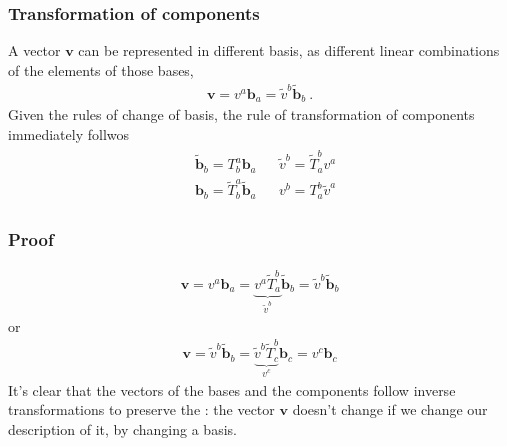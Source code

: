 \documentclass[letterpaper,10pt,english]{jupyterBook}
\begin{document}
\subsubsection{Transformation of components}
\label{\detokenize{ch/tensor-algebra-calculus/algebra:transformation-of-components}}
\sphinxAtStartPar
A vector \(\mathbf{v}\) can be represented in different basis, as different linear combinations of the elements of those bases,
\begin{equation*}
\begin{split}\mathbf{v} = v^{a} \mathbf{b}_a = \widetilde{v}^b \widetilde{\mathbf{b}}_b \ .\end{split}
\end{equation*}
\sphinxAtStartPar
Given the rules of change of basis, the rule of transformation of components immediately follwos
\begin{equation*}
\begin{split}\begin{aligned}
  & \widetilde{\mathbf{b}}_b = T_b^a \mathbf{b}_a                 && \widetilde{v}^b = \widetilde{T}^b_a v^a \\ 
  & \mathbf{b}_b = \widetilde{T}_{b}^{a} \widetilde{\mathbf{b}}_a &&           {v}^b = T^{b}_a \widetilde{v}^a
\end{aligned}\end{split}
\end{equation*}\subsubsection*{Proof}
\begin{equation*}
\begin{split}\mathbf{v} = v^a \mathbf{b}_a = \underbrace{v^a \widetilde{T}^{b}_a}_{\widetilde{v}^b} \widetilde{\mathbf{b}}_b = \widetilde{v}^b \widetilde{\mathbf{b}}_b \end{split}
\end{equation*}
\sphinxAtStartPar
or
\begin{equation*}
\begin{split}\mathbf{v} = \widetilde{v}^b \widetilde{\mathbf{b}}_b = \underbrace{\widetilde{v}^b \widetilde{T}^{b}_c}_{v^c} \mathbf{b}_c = v^c \mathbf{b}_c\end{split}
\end{equation*}
\sphinxAtStartPar
It’s clear that the vectors of the bases and the components follow inverse transformations to preserve the : the vector \(\mathbf{v}\) doesn’t change if we change our description of it, by changing a basis.
\end{document}
